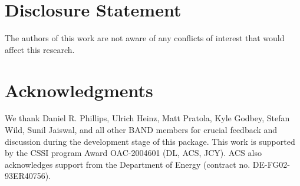 \documentclass[10pt, preprint,aps,prc,floatfix,
tightenlines,
nofootinbib,superscriptaddress]{revtex4-2}
\begin{document}
\section{Disclosure Statement}

The authors of this work are not aware of any conflicts of interest that would affect this research.

\section{Acknowledgments}

We thank Daniel R. Phillips, Ulrich Heinz, Matt Pratola, Kyle Godbey, Stefan Wild, Sunil Jaiswal, and all other BAND members for crucial feedback and discussion during the development stage of this package. This work is supported by the CSSI program Award OAC-2004601 (DL, ACS, JCY). ACS also acknowledges support from the Department of Energy (contract no. DE-FG02-93ER40756).

\end{document}
